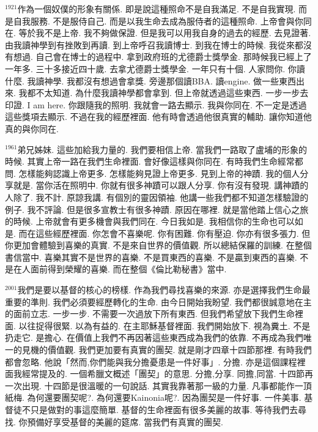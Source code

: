 \documentclass{book}
\begin{document}
$^{1921}$作為一個奴僕的形象有關係.
即是說這種照命不是自我滿足.
不是自我實現.
而是自我服務.
不是服侍自己.
而是以我生命去成為服侍者的這種照命.
上帝會與你同在.
等於我不是上帝.
我不夠做保證.
但是我可以用我自身的過去的經歷.
去見證著.
由我讀神學到有挫敗到再讀.
到上帝呼召我讀博士.
到我在博士的時候.
我從來都沒有想過.
自己會在博士的過程中.
拿到政府班的尤德爵士獎學金.
那時候我已經上了一年多.
三十多接近四十歲.
去拿尤德爵士獎學金.
一年只有十個.
人家問你.
你讀什麼.
我讀神學.
我都沒有想過會拿獎.
旁邊那個讀BBA.
讀engine.
做一些東西出來.
我都不太知道.
為什麼我讀神學都會拿到.
但上帝就透過這些東西.
一步一步去印證.
I am here.
你跟隨我的照明.
我就會一路去顯示.
我與你同在.
不一定是透過這些獎項去顯示.
不過在我的經歷裡面.
他有時會透過他很真實的輔助.
讓你知道他真的與你同在.

$^{1961}$弟兄姊妹.
這些加給我力量的.
我們要相信上帝.
當我們一路取了盧埔的形象的時候.
其實上帝一路在我們生命裡面.
會好像這樣與你同在.
有時我們生命經常都問.
怎樣能夠認識上帝更多.
怎樣能夠見證上帝更多.
見到上帝的神蹟.
我的個人分享就是.
當你活在照明中.
你就有很多神蹟可以跟人分享.
你有沒有發現.
講神蹟的人除了.
我不計.
原諒我講.
有個別的靈因領袖.
他講一些我們都不知道怎樣驗證的例子.
我不評論.
但是很多宣教士有很多神蹟.
原因在哪裡.
就是當他踏上信心之旅的時候.
上帝就會有更多機會與我們同在.
今日我如是.
我相信你的生命也可以如是.
而在這些經歷裡面.
你怎會不喜樂呢.
你有困難.
你有壓迫.
你亦有很多張力.
但你更加會體驗到喜樂的真實.
不是來自世界的價值觀.
所以總結保羅的訓練.
在整個書信當中.
喜樂其實不是世界的喜樂.
不是買東西的喜樂.
不是贏到東西的喜樂.
不是在人面前得到榮耀的喜樂.
而在整個《倫比勒秘書》當中.

$^{2001}$我們是要以基督的核心的榜樣.
作為我們尋找喜樂的來源.
亦是選擇我們生命最重要的準則.
我們必須要經歷轉化的生命.
由今日開始我盼望.
我們都很誠意地在主的面前立志.
一步一步.
不需要一次過放下所有東西.
但我們希望放下我們生命裡面.
以往捉得很緊.
以為有益的.
在主耶穌基督裡面.
我們開始放下.
視為糞土.
不是扔走它.
是擔心.
在價值上我們不再因著這些東西成為我們的依靠.
不再成為我們唯一的見機的價值觀.
我們更加要有真實的團契.
就是剛才四章十四節那裡.
有時我們都會忽略.
他說「然而,你們能與我分擔憂患是一件好事」.
分擔.
亦是這個課程裡面我經常提及的.
一個希臘文概述「團契」的意思.
分擔,分享.
同擔,同當.
十四節再一次出現.
十四節是很溫暖的一句說話.
其實我靠著那一級的力量.
凡事都能作一頂紙梅.
為何還要團契呢?.
為何還要Kainonia呢?.
因為團契是一件好事.
一件美事.
基督徒不只是做對的事這麼簡單.
基督的生命裡面有很多美麗的故事.
等待我們去尋找.
你預備好享受基督的美麗的筵席.
當我們有真實的團契.
\end{document}
